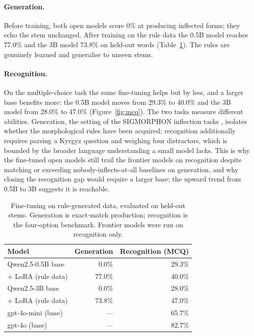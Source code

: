 \documentclass{article}
\begin{document}
\paragraph{Generation.} Before training, both open models score 0\% at producing
inflected forms; they echo the stem unchanged. After training on the rule data the
0.5B model reaches 77.0\% and the 3B model 73.8\% on held-out words
(Table~\ref{tab:finetune}). The rules are genuinely learned and generalise to unseen
stems.

\paragraph{Recognition.} On the multiple-choice task the same fine-tuning helps but by
less, and a larger base benefits more: the 0.5B model moves from 29.3\% to 40.0\% and
the 3B model from 28.0\% to 47.0\% (Figure~\ref{fig:mcq}). The two tasks measure
different abilities. Generation, the setting of the SIGMORPHON inflection
tasks \cite{vylomova2020sigmorphon}, isolates whether the morphological rules have been
acquired; recognition additionally requires parsing a Kyrgyz question and weighing four
distractors, which is bounded by the broader language understanding a small model
lacks. This is why the fine-tuned open models still trail the frontier models on
recognition despite matching or exceeding nobody-inflects-at-all baselines on
generation, and why closing the recognition gap would require a larger base; the upward
trend from 0.5B to 3B suggests it is reachable.

\begin{table}[h]
\centering
\small
\begin{tabular}{lrr}
\toprule
Model & Generation & Recognition (MCQ) \\
\midrule
Qwen2.5-0.5B base          & 0.0\%  & 29.3\% \\
\quad + LoRA (rule data)   & 77.0\% & 40.0\% \\
Qwen2.5-3B base            & 0.0\%  & 28.0\% \\
\quad + LoRA (rule data)   & 73.8\% & 47.0\% \\
gpt-4o-mini (base)         & ---    & 65.7\% \\
gpt-4o (base)              & ---    & 82.7\% \\
\bottomrule
\end{tabular}
\caption{Fine-tuning on rule-generated data, evaluated on held-out stems. Generation
is exact-match production; recognition is the four-option benchmark. Frontier models
were run on recognition only.}
\label{tab:finetune}
\end{table}
\end{document}
